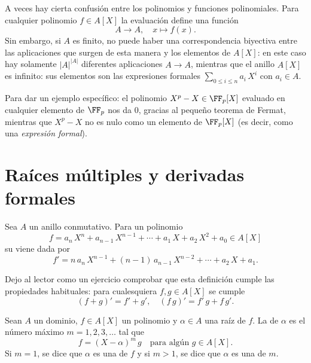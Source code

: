 \begin{comentario}
  A veces hay cierta confusión entre los polinomios y funciones
  polinomiales. Para cualquier polinomio $f \in A [X]$ la evaluación define una
  función
  $$A \to A, \quad x \mapsto f (x).$$
  Sin embargo, si $A$ es finito, no puede haber una correspondencia biyectiva
  entre las aplicaciones que surgen de esta manera y los elementos de $A [X]$:
  en este caso hay solamente $|A|^{|A|}$ diferentes aplicaciones $A \to A$,
  mientras que el anillo $A [X]$ es infinito: sus elementos son las expresiones
  formales $\sum_{0\le i\le n} a_i\,X^i$ con $a_i \in A$.

  Para dar un ejemplo específico: el polinomio $X^p - X \in \FF_p [X]$ evaluado
  en cualquier elemento de $\FF_p$ nos da $0$, gracias al pequeño teorema de
  Fermat, mientras que $X^p - X$ no es nulo como un elemento de $\FF_p [X]$ (es
  decir, como una \emph{expresión formal}).
\end{comentario}


\section{Raíces múltiples y derivadas formales}

\begin{definicion}
  Sea $A$ un anillo conmutativo. Para un polinomio
  $$f = a_n\,X^n + a_{n-1}\,X^{n-1} + \cdots + a_1\,X + a_2\,X^2 + a_0 \in A [X]$$
  su  viene dada por
  $$f' = n\,a_n\,X^{n-1} + (n-1)\,a_{n-1}\,X^{n-2} + \cdots + a_2\,X + a_1.$$
\end{definicion}

Dejo al lector como un ejercicio comprobar que esta definición cumple las
propiedades habituales: para cualesquiera $f,g\in A [X]$ se cumple
$$(f+g)' = f' + g', \quad (f\,g)' = f'\,g + f\,g'.$$

\begin{definicion}
  Sean $A$ un dominio, $f\in A [X]$ un polinomio y $\alpha \in A$ una raíz de
  $f$. La  de $\alpha$ es el número máximo
  $m = 1,2,3,\ldots$ tal que
  $$f = (X-\alpha)^m\,g \quad \text{para algún }g \in A [X].$$
  Si $m = 1$, se dice que $\alpha$ es una 
  de $f$ y si $m > 1$, se dice que $\alpha$ es una
   de
   $m$.
\end{definicion}

